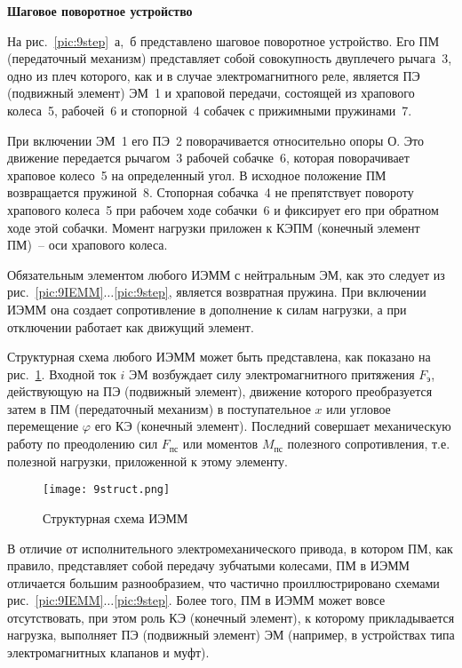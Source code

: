 \begin{flushleft}
\textbf{Шаговое поворотное устройство}
\end{flushleft}
 
На рис.~\ref{pic:9step}~а,~б представлено шаговое поворотное устройство. Его ПМ (передаточный механизм) представляет собой совокупность двуплечего рычага~3, одно из плеч которого, как и в случае электромагнитного реле, является ПЭ (подвижный элемент) ЭМ~1 и храповой передачи, состоящей из храпового колеса~5, рабочей~6 и стопорной~4 собачек с прижимными пружинами~7. 

При включении ЭМ~1 его ПЭ~2 поворачивается относительно опоры О. Это движение передается рычагом~3 рабочей собачке~6, которая поворачивает храповое колесо~5 на определенный угол. В исходное положение ПМ возвращается пружиной~8. Стопорная собачка~4 не препятствует повороту храпового колеса~5 при рабочем ходе собачки~6 и фиксирует его при обратном ходе этой собачки. Момент нагрузки приложен к КЭПМ (конечный элемент ПМ)~-- оси храпового колеса.

Обязательным элементом любого ИЭММ с нейтральным ЭМ, как это следует из рис.~\ref{pic:9IEMM}$ \ldots $\ref{pic:9step}, является возвратная пружина. При включении ИЭММ она создает сопротивление в дополнение к силам нагрузки, а при отключении работает как движущий элемент.

Структурная схема любого ИЭММ может быть представлена, как показано на рис.~\ref{pic:9struct}. Входной ток $ i $ ЭМ возбуждает силу электромагнитного притяжения $ F_\text{э} $, действующую на ПЭ (подвижный элемент), движение которого преобразуется затем в ПМ (передаточный механизм) в поступательное $ x $ или угловое перемещение $ \varphi $ его КЭ (конечный элемент). Последний совершает механическую работу по преодолению сил $ F_\text{пс} $ или моментов $ M_\text{пс} $ полезного сопротивления, т.е. полезной нагрузки, приложенной к этому элементу.

\begin{figure}[h!]
	\caption{ Структурная схема ИЭММ }
	\texttt{[image: 9struct.png]}
	\label{pic:9struct}
\end{figure}

В отличие от исполнительного электромеханического привода, в котором ПМ, как правило, представляет собой передачу зубчатыми колесами, ПМ в ИЭММ отличается большим разнообразием, что частично проиллюстрировано схемами рис.~\ref{pic:9IEMM}$ \ldots $\ref{pic:9step}. Более того, ПМ в ИЭММ может вовсе отсутствовать, при этом роль КЭ (конечный элемент), к которому прикладывается нагрузка, выполняет ПЭ (подвижный элемент) ЭМ (например, в устройствах типа электромагнитных клапанов и муфт).

